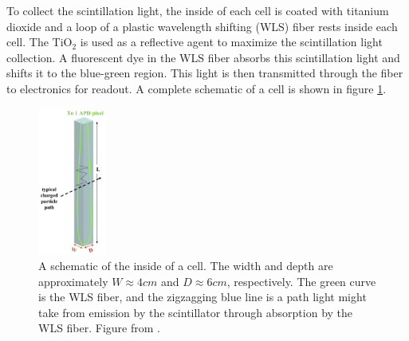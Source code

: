 To collect the scintillation light, the inside of each cell is coated with titanium dioxide and a loop of a plastic wavelength shifting (WLS) fiber rests inside each cell. The TiO$_{2}$ is used as a reflective agent to maximize the scintillation light collection. A fluorescent dye in the WLS fiber absorbs this scintillation light and shifts it to the blue-green region. This light is then transmitted through the fiber to electronics for readout. A complete schematic of a cell is shown in figure \ref{fig:DetCell}.
\begin{figure}[htb]
  \centering
  \includegraphics[width=0.2\textwidth]{figures/DetCell.png}
  \caption[A Detector Cell]{A schematic of the inside of a cell. The width and depth are approximately $W \approx 4\unit{cm}$ and $D \approx 6\unit{cm}$, respectively. The green curve is the WLS fiber, and the zigzagging blue line is a path light might take from emission by the scintillator through absorption by the WLS fiber. Figure from \cite{ref:TDRNOvA}.}
  \label{fig:DetCell}
\end{figure}

